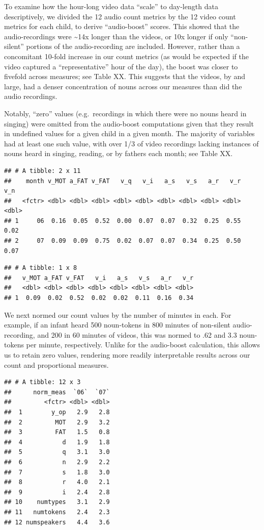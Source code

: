 \documentclass[man]{apa6}
\theoremstyle{definition}
\theoremstyle{definition}
\theoremstyle{definition}
\theoremstyle{remark}
\begin{document}
To examine how the hour-long video data \enquote{scale} to day-length
data descriptively, we divided the 12 audio count metrics by the 12
video count metrics for each child, to derive \enquote{audio-boost}
scores. This showed that the audio-recordings were \textasciitilde{}14x
longer than the videos, or 10x longer if only \enquote{non-silent}
portions of the audio-recording are included. However, rather than a
concomitant 10-fold increase in our count metrics (as would be expected
if the video captured a \enquote{representative} hour of the day), the
boost was closer to fivefold across measures; see Table XX. This
suggests that the videos, by and large, had a denser concentration of
nouns across our measures than did the audio recordings.

Notably, \enquote{zero} values (e.g.~recordings in which there were no
nouns heard in singing) were omitted from the audio-boost computations
given that they result in undefined values for a given child in a given
month. The majority of variables had at least one such value, with over
1/3 of video recordings lacking instances of nouns heard in singing,
reading, or by fathers each month; see Table XX.

\begin{verbatim}
## # A tibble: 2 x 11
##    month v_MOT a_FAT v_FAT   v_q   v_i   a_s   v_s   a_r   v_r   v_n
##   <fctr> <dbl> <dbl> <dbl> <dbl> <dbl> <dbl> <dbl> <dbl> <dbl> <dbl>
## 1     06  0.16  0.05  0.52  0.00  0.07  0.07  0.32  0.25  0.55  0.02
## 2     07  0.09  0.09  0.75  0.02  0.07  0.07  0.34  0.25  0.50  0.07
\end{verbatim}

\begin{verbatim}
## # A tibble: 1 x 8
##   v_MOT a_FAT v_FAT   v_i   a_s   v_s   a_r   v_r
##   <dbl> <dbl> <dbl> <dbl> <dbl> <dbl> <dbl> <dbl>
## 1  0.09  0.02  0.52  0.02  0.02  0.11  0.16  0.34
\end{verbatim}

We next normed our count values by the number of minutes in each. For
example, if an infant heard 500 noun-tokens in 800 minutes of non-silent
audio-recording, and 200 in 60 minutes of videos, this was normed to .62
and 3.3 noun-tokens per minute, respectively. Unlike for the audio-boost
calculation, this allows us to retain zero values, rendering more
readily interpretable results across our count and proportional
measures.

\begin{verbatim}
## # A tibble: 12 x 3
##      norm_meas  `06`  `07`
##         <fctr> <dbl> <dbl>
##  1        y_op   2.9   2.8
##  2         MOT   2.9   3.2
##  3         FAT   1.5   0.8
##  4           d   1.9   1.8
##  5           q   3.1   3.0
##  6           n   2.9   2.2
##  7           s   1.8   3.0
##  8           r   4.0   2.1
##  9           i   2.4   2.8
## 10    numtypes   3.1   2.9
## 11   numtokens   2.4   2.3
## 12 numspeakers   4.4   3.6
\end{verbatim}
\end{document}

